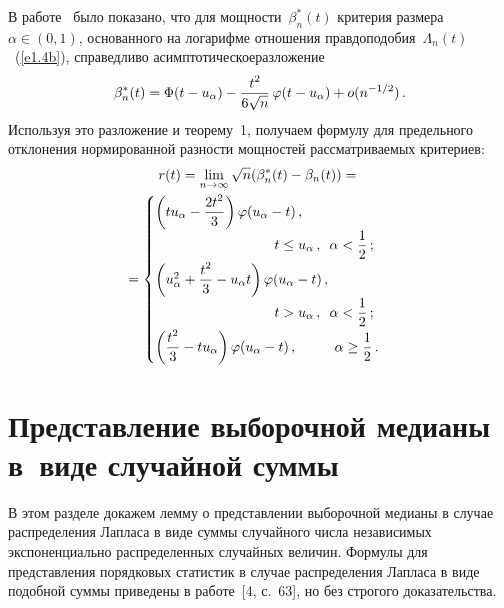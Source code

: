 \begin{multicols}{2}
\medskip

В работе~\cite{2ben} было показано, что для мощ\-ности~$\beta_n^*(t)$ 
критерия размера $\alpha\in (0,1)$, осно\-ван\-но\-го на
логарифме отношения прав\-до\-подобия~$\Lambda_n(t)$~(\ref{e1.4b}),
справедливо  асимптотическое\linebreak разложение
\begin{equation*}
\beta_n^*(t)=\Phi(t-u_\alpha) - \displaystyle\frac{\displaystyle t^2\mathstrut}{\displaystyle 6\sqrt{n}\mathstrut}\,
\varphi(t-u_\alpha)+ o(n^{-1/2})\,.
\end{equation*}
Используя это разложение и теорему~1, получаем формулу
для предельного отклонения нормированной разности мощностей
рассматриваемых критериев:
\begin{multline}
r(t)= \lim_{n \to \infty}\sqrt{n}(\beta_n^*(t)-\beta_n(t))
={}\\
{}=
\begin{cases}
\left(t u_\alpha-\fr{2t^2}{3}\right)
\varphi(u_\alpha-t)\,,\\
\hspace*{30mm} t \le u_\alpha\,,\enskip \alpha < \fr{1}{2}\,; \\
\left(u_\alpha^2+\fr{t^2}{3}-u_\alpha t \right)
\varphi(u_\alpha - t)\,,\\
\hspace*{30mm}  t>u_\alpha\,,\enskip \alpha<\fr{1}{2}\,; \\
\left(\fr{t^2}{3}-t u_\alpha\right)\varphi(u_\alpha-t)\,, \quad\quad\ \  \alpha \ge \fr{1}{2}\,. 
\end{cases}
\label{e2.14b}
\end{multline}

\section{Представление выборочной медианы в~виде случайной суммы}

В этом разделе докажем лемму о представлении выборочной медианы
в случае распределения Лапласа в виде суммы случайного числа
независимых экспоненциально распределенных случайных величин.
Формулы для представления порядковых статистик в случае распределения
Лапласа в виде подобной суммы приведены в работе~[4, с.~63],
но без строгого доказательства.

\bigskip


\end{multicols}
